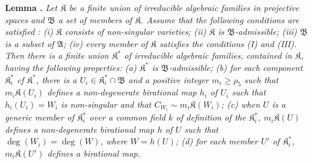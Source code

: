 \medskip
\noindent
{\bf Lemma .\label{art14-lem17}}
{\em Let $\mathfrak{K}$ be a finite union of irreducible algebraic families in projective spaces and $\mathfrak{B}$ a set of members of $\mathfrak{K}$. Assume that the following conditions are satisfied : {\rm(i)} $\mathfrak{K}$ consists of non-singular varieties; {\rm(ii)} $\mathfrak{K}$ is $\mathfrak{B}$-admissible; {\rm(iii)} $\mathfrak{B}$ is a subset of $\mathfrak{A}$; {\rm(iv)} every member of $\mathfrak{K}$ satisfies the conditions {\rm(I)} and {\rm(III)}. Then there is a finite union $\mathfrak{K}^{*}$ of irreducible algebraic families, contained in $\mathfrak{K}$, having the following properties: {\rm(a)} $\mathfrak{K}^{*}$ is $\mathfrak{B}$-admissible; {\rm(b)} for each component $\mathfrak{K}^{*}_{i}$ cf $\mathfrak{K}^{*}$, there is a $U_{i}\in \mathfrak{K}^{*}_{i}\cap \mathfrak{B}$ and a positive integer $m_{i}\geq \rho_{5}$ such that $m_{i}\mathfrak{K}(U_{i})$ defines a non-degenerate birational map $h_{i}$ of $U_{i}$ such that $h_{i}(U_{i})=W_{i}$ is non-singular and that $C_{W_{i}}\sim m_{i}\mathfrak{K}(W_{i})$; {\rm(c)} when $U$ is a generic member of $\mathfrak{K}^{*}_{i}$ over a common field $k$ of definition of the $\mathfrak{K}^{*}_{i}$, $m_{i}\mathfrak{K}(U)$ defines a non-degenerate birational map $h$ of $U$ such that $\deg(W_{i})=\deg(W)$, where $W=h(U)$; {\rm(d)} for each member $U'$ of $\mathfrak{K}^{*}_{i}$, $m_{i}\mathfrak{K}(U')$ defines a birational map.}

